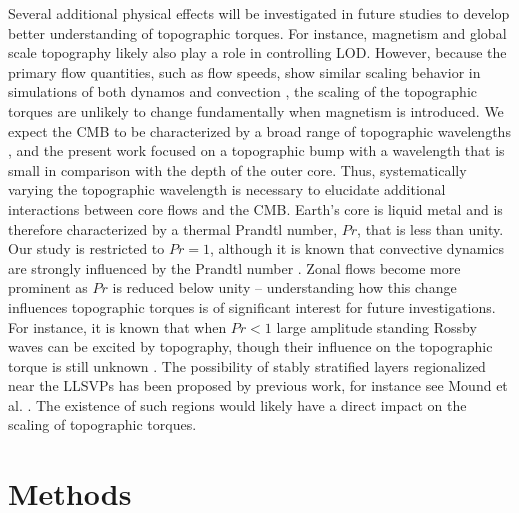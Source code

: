 	
%

\textcolor{\revtxt}{Several additional physical effects will be investigated in future studies to develop better understanding of topographic torques. For instance, magnetism and global scale topography likely also play a role in controlling LOD. }
However, because the primary flow quantities, such as flow speeds, show similar scaling behavior in simulations of both dynamos and convection \citep{eK13b,mC21,jN24}, the scaling of the topographic torques are unlikely to change fundamentally when magnetism is introduced.  
\textcolor{\revtxt}{We expect the CMB to be characterized by a broad range of topographic wavelengths \citep{pK21,aE18}, and the present work focused on a topographic bump with a wavelength that is small in comparison with the depth of the outer core. Thus, systematically varying the topographic wavelength is necessary to elucidate additional interactions between core flows and the CMB.  Earth's core is liquid metal and is therefore characterized by a thermal Prandtl number, $Pr$, that is less than unity. Our study is restricted to $Pr =1$, although it is known that convective dynamics are strongly influenced by the Prandtl number \citep{mC12b,jmA18,tV18b}. Zonal flows become more prominent \textcolor{\revttxt}{as} $Pr$ is reduced below unity \citep{jA01} -- understanding how this change influences topographic torques is of significant interest for future investigations. For instance, it is known that when $Pr<1$ large amplitude standing Rossby waves can be excited by topography, though their influence on the topographic torque is still unknown \citep{mC12}. The possibility of stably stratified layers regionalized near the LLSVPs has been proposed by previous work, for instance see Mound et al. \citep{jM19}. The existence of such regions would likely have a direct impact on the scaling of topographic torques.}

%
%
%
\section{Methods}

